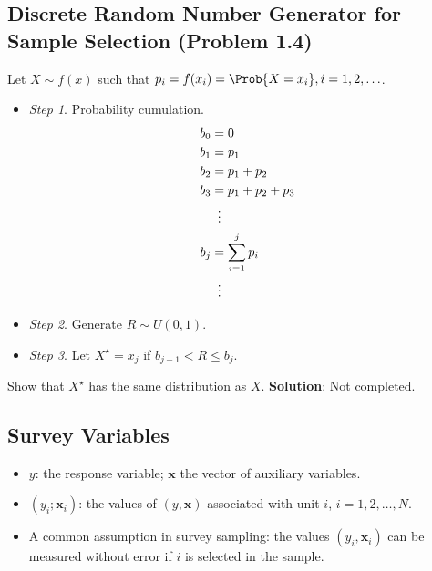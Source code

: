 \documentclass[oneside]{book}\usepackage[]{graphicx}\usepackage[svgnames]{xcolor}
\providecommand{\Vector}[1]{\bm{#1}}%
\begin{document}
\subsection*{Discrete Random Number Generator for Sample Selection (Problem 1.4)}
\begin{Example}{}
      Let $ X \sim f(x) $ such that $p_i=f(x_i)=\Prob{X=x_i},i=1,2,\ldots$.
      \begin{itemize}
            \item \emph{Step 1}. Probability cumulation.
                  \begin{align*}
                        b_0 & =0                 \\
                        b_1 & =p_1               \\
                        b_2 & =p_1+p_2           \\
                        b_3 & =p_1+p_2+p_3       \\
                            & \vdotswithin{=}    \\
                        b_j & =\sum_{i=1}^{j}p_i \\
                            & \vdotswithin{=}
                  \end{align*}
            \item \emph{Step 2}. Generate $ R\sim U(0,1) $.
            \item \emph{Step 3}. Let $ X^\star=x_j $ if $ b_{j-1}<R\le b_j $.
      \end{itemize}
      Show that $ X^\star $ has the same distribution as $ X $.
      \tcblower{}
      \textbf{Solution}: Not completed.
\end{Example}
\subsection*{Survey Variables}
\begin{Regular}{}
      \begin{itemize}
            \item $ y $: the response variable; $ \Vector{x} $
                  the vector of auxiliary variables.
            \item $ (y_i;\Vector{x}_i) $: the values of $ (y,\Vector{x}) $
                  associated with unit $ i $, $ i=1,2,\ldots,N $.
            \item A common assumption in survey sampling: the values $ (y_i,\Vector{x}_i) $
                  can be measured without error if $ i $ is selected in the sample.
      \end{itemize}
\end{Regular}
\end{document}
